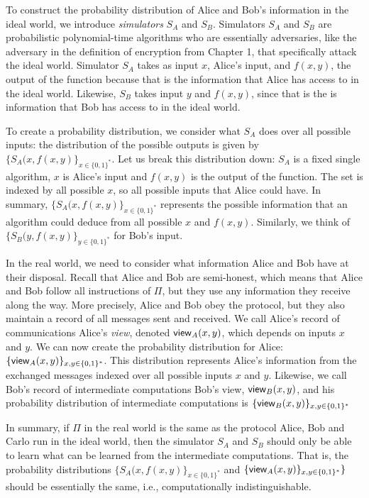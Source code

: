 To construct the probability distribution of Alice and Bob's information in the ideal world, we introduce \textit{simulators} $S_A$ and $S_B$.
Simulators $S_A$ and $S_B$ are probabilistic polynomial-time algorithms who are essentially adversaries, like the adversary in the definition of encryption from Chapter 1, that specifically attack the ideal world.
Simulator $S_A$ takes as input $x$, Alice's input, and $f(x,y)$, the output of the function because that is the information that Alice has access to in the ideal world.
Likewise, $S_B$ takes input $y$ and $f(x,y)$, since that is the is information that Bob has access to in the ideal world.

To create a probability distribution, we consider what $S_A$ does over all possible inputs: the distribution of the possible outputs is given by $\{S_A(x, f(x,y)\}_{x \in \{0,1\}^*}$.
Let us break this distribution down: $S_A$ is a fixed single algorithm, $x$ is Alice's input and $f(x,y)$ is the output of the function.
The set is indexed by all possible $x$, so all possible inputs that Alice could have.
In summary, $\{S_A(x, f(x,y)\}_{x \in \{0,1\}^*}$ represents the possible information that an algorithm could deduce from all possible $x$ and $f(x,y)$.
Similarly, we think of $\{S_B(y, f(x,y)\}_{y \in \{0,1\}^*}$ for Bob's input.

In the real world, we need to consider what information Alice and Bob have at their disposal.
Recall that Alice and Bob are semi-honest, which means that Alice and Bob follow all instructions of $\Pi$, but they use any information they receive along the way.
More precisely, Alice and Bob obey the protocol, but they also maintain a record of all messages sent and received.
We call Alice's record of communications Alice's \textit{view}, denoted ${\sf view}_A(x, y)$, which depends on inputs $x$ and $y$.
We can now create the probability distribution for Alice: $\{{\sf view}_A(x, y)\}_{x, y \in \{0,1\}^*}$.
This distribution represents Alice's information from the exchanged messages indexed over all possible inputs $x$ and $y$.
Likewise, we call Bob's record of intermediate computations Bob's view, ${\sf view}_B(x, y)$, and his probability distribution of intermediate computations is $\{{\sf view}_B(x, y)\}_{x,y \in \{0,1\}^*}$

In summary, if $\Pi$ in the real world is the same as the protocol Alice, Bob and Carlo run in the ideal world, then the simulator $S_A$ and $S_B$ should only be able to learn what can be learned from the intermediate computations. 
That is, the probability distributions $\{S_A(x, f(x,y)\}_{x \in \{0,1\}^*}$ and $\{{\sf view}_A(x, y)\}_{x, y \in \{0,1\}^*}\}$ should be essentially the same, i.e., computationally indistinguishable.

